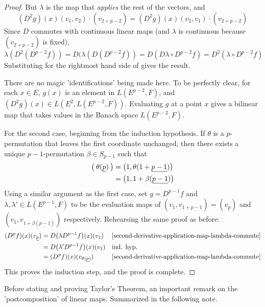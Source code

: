\documentclass[../main-manifolds.tex]{subfiles}
\begin{document}
\begin{proof}
    But $\lambda$ is the map that \emph{applies} the rest of the vectors, and
    \begin{equation}\label{second-derivative-D2g-equality}
        (D^2g)(x)(v_1,v_2)\cdot (v_{2+\underline{p-2}}) = (D^2g)(x)(v_2,v_1)\cdot (v_{2+\underline{p-2}})
    \end{equation}
    Since $D$ commutes with continuous linear maps (and $\lambda$ is continuous because $(v_{2+\underline{p-2}})$ is fixed),
    \begin{equation}\label{second-derivative-application-map-lambda-commute}
       \lambda(D^2(D^{p-2}f)) = D(\lambda(D(D^{p-2}f)) = D(D\lambda\circ D^{p-2}f) = D^2(\lambda\circ D^{p-2}f) 
    \end{equation}
    Substituting  for the rightmost hand side of  gives the result.
    \begin{note}
        There are no magic 'identifications' being made here. To be perfectly clear, for each $x\in E$, $g(x)$ is an element in $L(E^{p-2}, F)$, and $(D^2g)(x)\in L(E^2, L(E^{p-2}, F))$. Evaluating $g$ at a point $x$ gives a bilinear map that takes values in the Banach space $L(E^{p-2}, F)$.
    \end{note}

    For the second case, beginning from the induction hypothesis. If $\theta$ is a $p$-permutation that leaves the first coordinate unchanged, then there exists a unique $p-1$-permutation $\beta\in S_{p-1}$ such that
    \begin{align}\label{multi-derivatives-theta-def}
    \qty\big(\:\theta(\underline{p})\:) &= \qty\big(1,\theta(1+\underline{p-1}))\nonumber\\
    &= \qty\big(1,1+\beta(\underline{p-1}))    
    \end{align}
    Using a similar argument as the first case, set $g = D^{p-1}f$ and $\lambda, \lambda' \in L(E^{p-1}, F)$ to be the evaluation maps of $(v_1, v_{1+\underline{p-1}}) = (v_{\underline{p}})$ and $(v_1, v_{1+\beta(\underline{p-1})})$ respectively. Rehearsing the same proof as before:
    \begin{align*}
        (D^pf)(x)(v_{\underline{p}}) &= D\qty\big(\lambda D^{p-1}f)(x)(v_1)&&\text{\Cref{second-derivative-application-map-lambda-commute}}\\
        &= D\qty\big(\lambda' D^{p-1}f)(x)(v_1) &&\text{ind. hyp.}\\
        &= (D^pf)(x)(v_{\theta(\underline{p})})&&\text{\Cref{second-derivative-application-map-lambda-commute}}
    \end{align*}
    This proves the induction step, and the proof is complete.
\end{proof}
Before stating and proving Taylor's Theorem, an important remark on the 'postcomposition' of linear maps. Summarized in the following note. 
\end{document}

